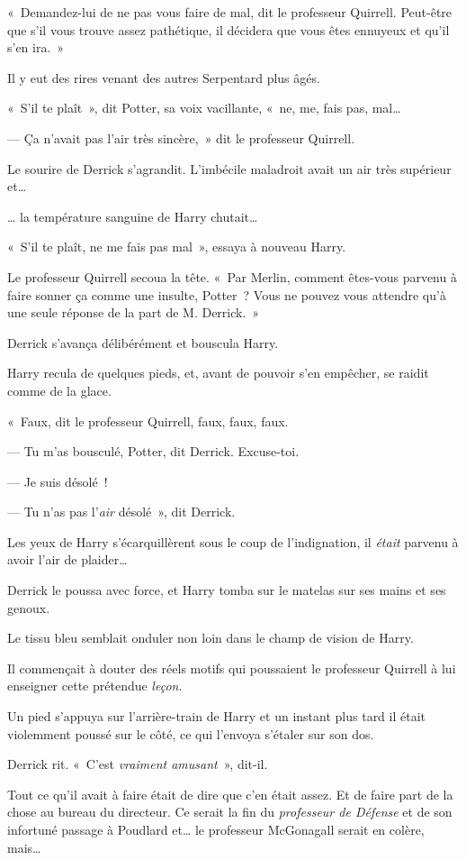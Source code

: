 «~Demandez-lui de ne pas vous faire de mal, dit le professeur Quirrell.
Peut-être que s'il vous trouve assez pathétique, il décidera que vous êtes ennuyeux et qu'il s'en ira.~»

Il y eut des rires venant des autres Serpentard plus âgés.

«~S'il te plaît~», dit Potter, sa voix vacillante, «~ne, me, fais pas, mal…

--- Ça n'avait pas l'air très sincère,~» dit le professeur Quirrell.

Le sourire de Derrick s'agrandit.
L'imbécile maladroit avait un air très supérieur et…

… la température sanguine de Harry chutait…

«~S'il te plaît, ne me fais pas mal~», essaya à nouveau Harry.

Le professeur Quirrell secoua la tête.
«~Par Merlin, comment êtes-vous parvenu à faire sonner ça comme une insulte, Potter~?
Vous ne pouvez vous attendre qu'à une seule réponse de la part de M. Derrick.~»

Derrick s'avança délibérément et bouscula Harry.

Harry recula de quelques pieds, et, avant de pouvoir s'en empêcher, se raidit comme de la glace.

«~Faux, dit le professeur Quirrell, faux, faux, faux.

--- Tu m'as bousculé, Potter, dit Derrick.
Excuse-toi.

--- Je suis désolé~!

--- Tu n'as pas l'\emph{air} désolé~», dit Derrick.

Les yeux de Harry s'écarquillèrent sous le coup de l'indignation, il \emph{était} parvenu à avoir l'air de plaider…

Derrick le poussa avec force, et Harry tomba sur le matelas sur ses mains et ses genoux.

Le tissu bleu semblait onduler non loin dans le champ de vision de Harry.

Il commençait à douter des réels motifs qui poussaient le professeur Quirrell à lui enseigner cette prétendue \emph{leçon}.

Un pied s'appuya sur l'arrière-train de Harry et un instant plus tard il était violemment poussé sur le côté, ce qui l'envoya s'étaler sur son dos.

Derrick rit.
«~C'est \emph{vraiment amusant}~», dit-il.

Tout ce qu'il avait à faire était de dire que c'en était assez.
Et de faire part de la chose au bureau du directeur.
Ce serait la fin du \emph{professeur de Défense} et de son infortuné passage à Poudlard et… le professeur McGonagall serait en colère, mais…


